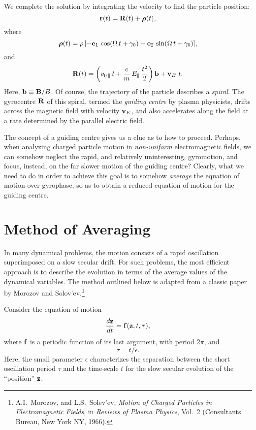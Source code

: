 We complete the solution by integrating the velocity to find the particle
position:
\begin{equation}
{\bf r}(t) = {\bf R}(t) + \mbox{\boldmath$\rho$}(t),
\end{equation}
where
\begin{equation}
\mbox{\boldmath$\rho$}(t) = \rho \,[-{\bf e}_1\,\cos({\Omega}\, t+\gamma_0)
+{\bf e}_2\,\sin({\Omega}\,t + \gamma_0)],
\end{equation}
and
\begin{equation}
{\bf R}(t)=\left(v_{0\,\parallel } \,t + \frac{e}{m}\, E_\parallel \,\frac{t^2}{2}\right)
{\bf b} + {\bf v}_E \,\,t.
\end{equation}
Here, ${\bf b} \equiv {\bf B}/B$. Of course, the trajectory of the particle
describes a {\em spiral}. The gyrocentre ${\bf R}$ of this spiral, termed
the {\em guiding centre}\/ by plasma physicists, drifts across the magnetic
field with velocity ${\bf v}_E$, and also accelerates along the
field at a rate determined by the parallel electric field.

The concept of a guiding centre gives us a clue as to how to proceed. Perhaps,
when analyzing charged particle motion  in 
{\em non-uniform}\/  electromagnetic
fields, we can somehow neglect the rapid, and relatively uninteresting, gyromotion,
and focus, instead, on the far slower
motion of the guiding centre? Clearly, what we
need to do in order to achieve this goal is to somehow {\em average}\/ the equation of motion over gyrophase, so
as to obtain a reduced equation of motion for the guiding centre. 

\section{Method of Averaging}
In many dynamical problems, the motion consists of a rapid oscillation superimposed on
a slow secular drift. For such problems, the most efficient approach
is to describe the evolution in terms of the average values of the dynamical
variables. The method outlined below is adapted from a classic
paper by Morozov and Solov'ev.\footnote{A.I.~Morozov, and L.S.~Solev'ev, 
{\em Motion of Charged Particles in Electromagnetic Fields}, in
{\em Reviews of Plasma Physics}, Vol.~2 (Consultants Bureau, New York NY, 1966).}

Consider the equation of motion
\begin{equation}\label{e2.8}
\frac{d{\bf z}}{dt} = {\bf f}({\bf z}, t, \tau),
\end{equation}
where ${\bf f}$ is a periodic function of its last argument, with
period $2\pi$, and
\begin{equation}\label{e2.9}
\tau = t/\epsilon.
\end{equation}
Here, the small parameter $\epsilon$ characterizes the separation between the
short oscillation period $\tau$ and the time-scale $t$ for the slow secular evolution
of the ``position'' ${\bf z}$.

